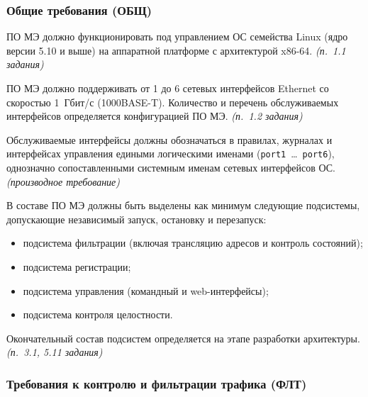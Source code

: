 \documentclass[12pt,a4paper,final]{article}
\newenvironment{reqs}
  {\begin{description}[style=sameline,leftmargin=2.2cm,labelwidth=2.0cm,
     labelsep=0.2cm,font=\normalfont\bfseries,itemsep=3pt]}
  {\end{description}}
\newcommand{\src}[1]{\textit{(п.~#1 задания)}}
\newcommand{\der}{\textit{(производное требование)}}
\begin{document}
\subsubsection{Общие требования (ОБЩ)}

\begin{reqs}
\item[ОБЩ-01] ПО МЭ должно функционировать под управлением ОС семейства Linux
  (ядро версии 5.10 и выше) на аппаратной платформе с архитектурой x86-64.
  \src{1.1}
\item[ОБЩ-02] ПО МЭ должно поддерживать от 1 до 6 сетевых интерфейсов Ethernet
  со скоростью 1~Гбит/с (1000BASE-T). Количество и перечень обслуживаемых
  интерфейсов определяется конфигурацией ПО МЭ. \src{1.2}
\item[ОБЩ-03] Обслуживаемые интерфейсы должны обозначаться в правилах, журналах
  и интерфейсах управления едиными логическими именами (\texttt{port1}~\ldots~\texttt{port6}),
  однозначно сопоставленными системным именам сетевых интерфейсов ОС. \der
\item[ОБЩ-04] В составе ПО МЭ должны быть выделены как минимум следующие подсистемы,
  допускающие независимый запуск, остановку и перезапуск:
  \begin{itemize}
  \item подсистема фильтрации (включая трансляцию адресов и контроль состояний);
  \item подсистема регистрации;
  \item подсистема управления (командный и web-интерфейсы);
  \item подсистема контроля целостности.
  \end{itemize}
  Окончательный состав подсистем определяется на этапе разработки архитектуры.
  \src{3.1, 5.11}
\end{reqs}

\subsubsection{Требования к контролю и фильтрации трафика (ФЛТ)}
\end{document}
